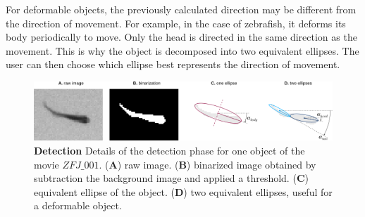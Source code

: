         For deformable objects, the previously calculated direction may be different from the direction of movement. For example, in the case of zebrafish, it deforms its body periodically to move. Only the head is directed in the same direction as the movement. This is why the object is decomposed into two equivalent ellipses. The user can then choose which ellipse best represents the direction of movement.

        \begin{figure}[h!]
        \centering
        \includegraphics[width=1\textwidth]{part_1/assets/Figure_ellipse.png}
        \caption{\textbf{Detection} Details of the detection phase for one object of the movie $ZFJ\_001$.
            (\textbf{A}) raw image.
            (\textbf{B}) binarized image obtained by subtraction the background image and applied a threshold.
            (\textbf{C}) equivalent ellipse of the object.
            (\textbf{D}) two equivalent ellipses, useful for a deformable object.}
        \label{part_1:fig_2}
        \end{figure}

